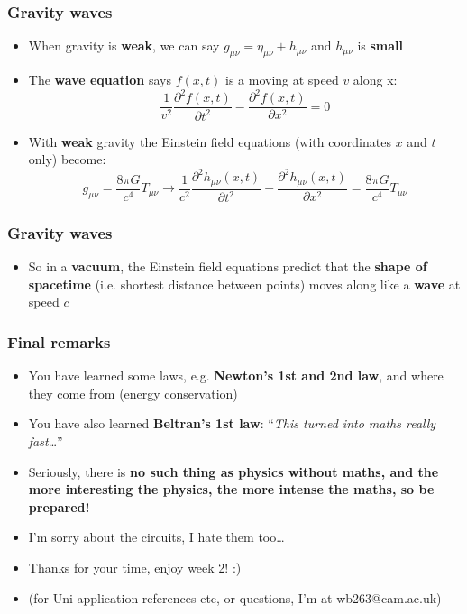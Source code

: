 \documentclass{beamer}
\begin{document}
\begin{frame}
  \frametitle{Gravity waves}
  \begin{itemize}
    \item<1-> When gravity is \textbf{weak}, we can say $g_{\mu\nu}=\eta_{\mu\nu}+h_{\mu\nu}$ and $h_{\mu\nu}$ is \textbf{small}
    \item<2-> The \textbf{wave equation} says $f(x,t)$ is a  moving at speed $v$ along x:
      \begin{equation*}
	\frac{1}{v^2}\frac{\partial^2f(x,t)}{\partial t^2}-\frac{\partial^2f(x,t)}{\partial x^2}=0
      \end{equation*}
    \item<3-> With \textbf{weak} gravity the Einstein field equations (with coordinates $x$ and $t$ only) become:
      \begin{equation*}
	g_{\mu\nu}=\frac{8\pi G}{c^4}T_{\mu\nu}\to\frac{1}{c^2}\frac{\partial^2h_{\mu\nu}(x,t)}{\partial t^2}-\frac{\partial^2h_{\mu\nu}(x,t)}{\partial x^2}=\frac{8\pi G}{c^4}T_{\mu\nu}
      \end{equation*}
  \end{itemize}
\end{frame}

\begin{frame}
  \frametitle{Gravity waves}
  \begin{itemize}
    \item<1-> So in a \textbf{vacuum}, the Einstein field equations predict that the \textbf{shape of spacetime} (i.e. shortest distance between points) moves along like a \textbf{wave} at speed $c$
  \end{itemize}
\end{frame}

\begin{frame}
  \frametitle{Final remarks}
  \begin{itemize}
    \item<1-> You have learned some laws, e.g. \textbf{Newton's 1st and 2nd law}, and where they come from (energy conservation)
    \item<2-> You have also learned \textbf{Beltran's 1st law}: ``\textit{This turned into maths really fast}\ldots''
    \item<3-> Seriously, there is \textbf{no such thing as physics without maths, and the more interesting the physics, the more intense the maths, so be prepared!}
    \item<4-> I'm sorry about the circuits, I hate them too\ldots
    \item<5-> Thanks for your time, enjoy week 2! :)
  \item<6-> (for Uni application references etc, or questions, I'm at wb263@cam.ac.uk)
  \end{itemize}
\end{frame}
\end{document}
